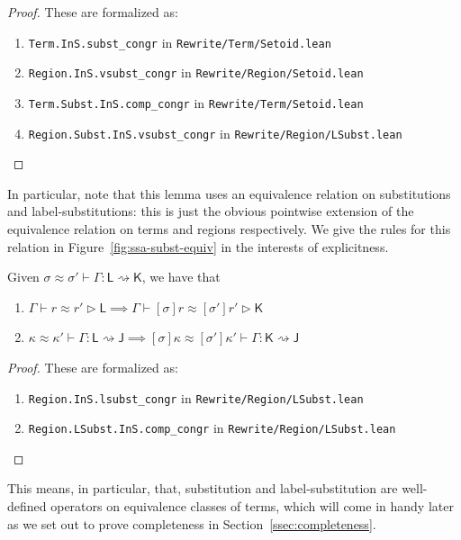 \documentclass[acmsmall,screen,review]{acmart}
\newcommand{\ms}[1]{\ensuremath{\mathsf{#1}}}
\newcommand{\lbsubst}[4]{#1 \vdash #2: #3 \rightsquigarrow #4}
\newcommand{\teqv}{\approx}
\newcommand{\lbeq}[4]{#1 \vdash #2 \teqv #3 \rhd {#4}}
\newcommand{\lbseq}[5]{\lbsubst{#1 \teqv #2}{#3}{#4}{#5}}
\begin{document}
\begin{proof}
  These are formalized as:
  \begin{enumerate}[label=(\alph*)]
    \item \texttt{Term.InS.subst_congr} in \texttt{Rewrite/Term/Setoid.lean}
    \item \texttt{Region.InS.vsubst_congr} in \texttt{Rewrite/Region/Setoid.lean}
    \item \texttt{Term.Subst.InS.comp_congr} in \texttt{Rewrite/Term/Setoid.lean}
    \item \texttt{Region.Subst.InS.vsubst_congr} in \texttt{Rewrite/Region/LSubst.lean}
  \end{enumerate}
\end{proof}
In particular, note that this lemma uses an equivalence relation on substitutions and
label-substitutions: this is just the obvious pointwise extension of the equivalence relation on
terms and regions respectively. We give the rules for this relation in
Figure~\ref{fig:ssa-subst-equiv} in the interests of explicitness.

\begin{lemma}
  Given $\lbseq{\sigma}{\sigma'}{\Gamma}{\ms{L}}{\ms{K}}$, we have that
  \begin{enumerate}[label=(\alph*)]
    \item $\lbeq{\Gamma}{r}{r'}{\ms{L}} \implies \lbeq{\Gamma}{[\sigma]r}{[\sigma']r'}{\ms{K}}$
    \item $\lbseq{\kappa}{\kappa'}{\Gamma}{\ms{L}}{\ms{J}}
      \implies \lbseq{[\sigma]\kappa}{[\sigma']\kappa'}{\Gamma}{\ms{K}}{\ms{J}}$
  \end{enumerate}
\end{lemma}
\begin{proof}
  These are formalized as:
  \begin{enumerate}[label=(\alph*)]
    \item \texttt{Region.InS.lsubst_congr} in \texttt{Rewrite/Region/LSubst.lean}
    \item \texttt{Region.LSubst.InS.comp_congr} in \texttt{Rewrite/Region/LSubst.lean}
  \end{enumerate}
\end{proof}
This means, in particular, that, substitution and label-substitution are well-defined operators on
equivalence classes of terms, which will come in handy later as we set out to prove completeness
in Section~\ref{ssec:completeness}.
\end{document}
